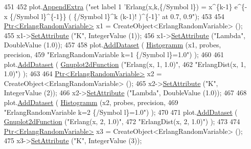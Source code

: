 \begin{DoxyCode}
451 
452     plot.\hyperlink{classns3_1_1Gnuplot_a649a3041b9d0ea21a212b5ad9b28ecbf}{AppendExtra} (\textcolor{stringliteral}{"set label 1 'Erlang(x,k,\{/Symbol l\}) = x^\{k-1\} e^\{-x \{/Symbol l\}^\{-1\}\} (
       \{/Symbol l\}^k (k-1)! )^\{-1\}' at 0.7, 0.9"});
453 
454     \hyperlink{classns3_1_1Ptr}{Ptr<ErlangRandomVariable>} x1 = CreateObject<ErlangRandomVariable> ();
455     x1->\hyperlink{classns3_1_1ObjectBase_ac60245d3ea4123bbc9b1d391f1f6592f}{SetAttribute} (\textcolor{stringliteral}{"K"}, IntegerValue (1));
456     x1->\hyperlink{classns3_1_1ObjectBase_ac60245d3ea4123bbc9b1d391f1f6592f}{SetAttribute} (\textcolor{stringliteral}{"Lambda"}, DoubleValue (1.0));
457 
458     plot.\hyperlink{classns3_1_1Gnuplot_a306ec724a327cf9ab699700f31fca0a1}{AddDataset} ( \hyperlink{main-random-variable-stream_8cc_a2cfd3837ab3f2e816cf53486d7a186b5}{Histogramm} (x1, probes, precision,
459                                   \textcolor{stringliteral}{"ErlangRandomVariable k=1 \{/Symbol l\}=1.0"}) );
460 
461     plot.\hyperlink{classns3_1_1Gnuplot_a306ec724a327cf9ab699700f31fca0a1}{AddDataset} ( \hyperlink{classns3_1_1Gnuplot2dFunction}{Gnuplot2dFunction} (\textcolor{stringliteral}{"Erlang(x, 1, 1.0)"},
462                                          \textcolor{stringliteral}{"ErlangDist(x, 1, 1.0)"}) );
463 
464     \hyperlink{classns3_1_1Ptr}{Ptr<ErlangRandomVariable>} x2 = CreateObject<ErlangRandomVariable> ();
465     x2->\hyperlink{classns3_1_1ObjectBase_ac60245d3ea4123bbc9b1d391f1f6592f}{SetAttribute} (\textcolor{stringliteral}{"K"}, IntegerValue (2));
466     x2->\hyperlink{classns3_1_1ObjectBase_ac60245d3ea4123bbc9b1d391f1f6592f}{SetAttribute} (\textcolor{stringliteral}{"Lambda"}, DoubleValue (1.0));
467 
468     plot.\hyperlink{classns3_1_1Gnuplot_a306ec724a327cf9ab699700f31fca0a1}{AddDataset} ( \hyperlink{main-random-variable-stream_8cc_a2cfd3837ab3f2e816cf53486d7a186b5}{Histogramm} (x2, probes, precision,
469                                   \textcolor{stringliteral}{"ErlangRandomVariable k=2 \{/Symbol l\}=1.0"}) );
470 
471     plot.\hyperlink{classns3_1_1Gnuplot_a306ec724a327cf9ab699700f31fca0a1}{AddDataset} ( \hyperlink{classns3_1_1Gnuplot2dFunction}{Gnuplot2dFunction} (\textcolor{stringliteral}{"Erlang(x, 2, 1.0)"},
472                                          \textcolor{stringliteral}{"ErlangDist(x, 2, 1.0)"}) );
473 
474     \hyperlink{classns3_1_1Ptr}{Ptr<ErlangRandomVariable>} x3 = CreateObject<ErlangRandomVariable> ();
475     x3->\hyperlink{classns3_1_1ObjectBase_ac60245d3ea4123bbc9b1d391f1f6592f}{SetAttribute} (\textcolor{stringliteral}{"K"}, IntegerValue (3));

\end{DoxyCode}
